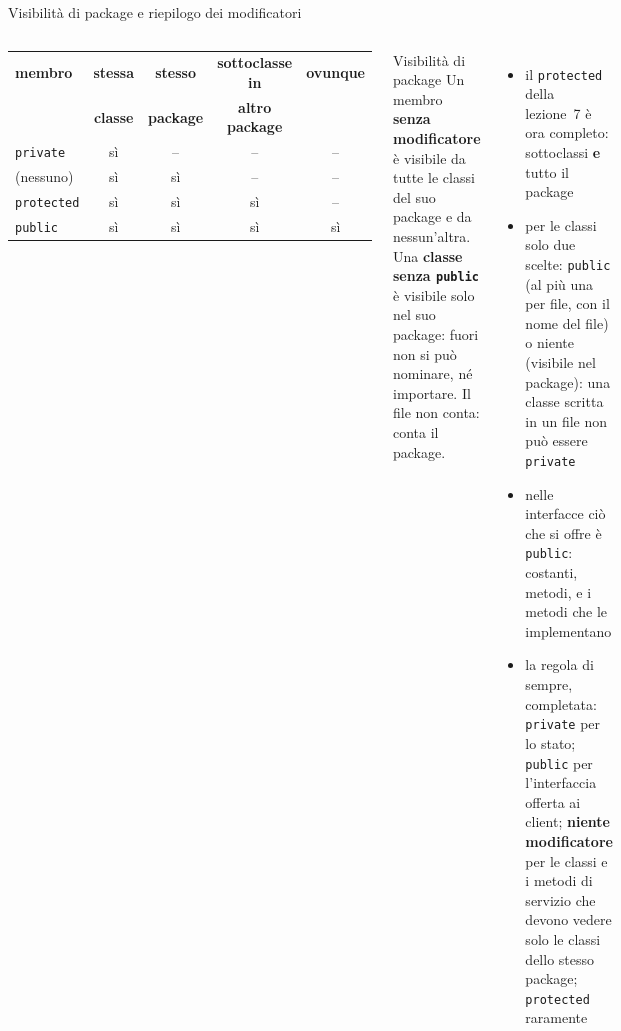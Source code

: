 \documentclass[10pt,aspectratio=169]{beamer}
\begin{document}
\begin{frame}[fragile]{Visibilità di package e riepilogo dei modificatori}
\begin{columns}[T]
\footnotesize
\begin{center}
\renewcommand{\arraystretch}{1.25}
\scriptsize
\begin{tabular}{@{}lcccc@{}}
\toprule
\textbf{membro} & \textbf{stessa} & \textbf{stesso} & \textbf{sottoclasse in} & \textbf{ovunque} \\
 & \textbf{classe} & \textbf{package} & \textbf{altro package} & \\
\midrule
\texttt{private} & sì & -- & -- & -- \\
(nessuno) & sì & sì & -- & -- \\
\texttt{protected} & sì & sì & sì & -- \\
\texttt{public} & sì & sì & sì & sì \\
\bottomrule
\end{tabular}
\end{center}
\begin{block}{Visibilità di package}
\small Un membro \textbf{senza modificatore} è visibile da tutte le classi del suo package e da nessun'altra. Una \textbf{classe senza \texttt{public}} è visibile solo nel suo package: fuori non si può nominare, né importare. Il file non conta: conta il package.
\end{block}

\footnotesize
\begin{itemize}\itemsep=3pt
    \item il \texttt{protected} della lezione~7 è ora completo: sottoclassi \textbf{e} tutto il package
    \item per le classi solo due scelte: \texttt{public} (al più una per file, con il nome del file) o niente (visibile nel package): una classe scritta in un file non può essere \texttt{private}
    \item nelle interfacce ciò che si offre è \texttt{public}: costanti, metodi, e i metodi che le implementano
    \item la regola di sempre, completata: \texttt{private} per lo stato; \texttt{public} per l'interfaccia offerta ai client; \textbf{niente modificatore} per le classi e i metodi di servizio che devono vedere solo le classi dello stesso package; \texttt{protected} raramente
\end{itemize}
\end{columns}
\end{frame}
\end{document}
